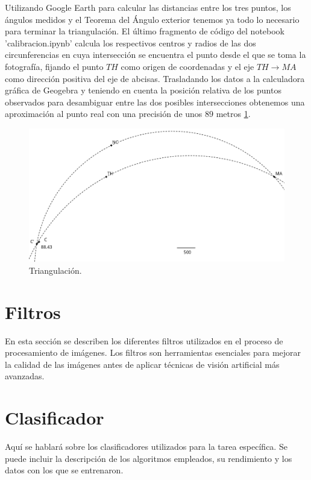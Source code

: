 \documentclass[12pt]{article}
\begin{document}
Utilizando Google Earth para calcular las distancias entre los tres puntos, los ángulos medidos y el Teorema del Ángulo exterior tenemos ya todo lo necesario para terminar la triangulación.
El último fragmento de código del notebook 'calibracion.ipynb' calcula los respectivos centros y radios de las dos circunferencias en cuya intersección se encuentra el punto desde el que se toma la fotografía, fijando el punto $TH$ como origen de coordenadas y el eje $TH \rightarrow MA$ como dirección positiva del eje de abcisas.
Trasladando los datos a la calculadora gráfica de Geogebra y teniendo en cuenta la posición relativa de los puntos observados para desambiguar entre las dos posibles intersecciones obtenemos una aproximación al punto real con una precisión de unos $89$ metros \ref{fig:geogebra_triangulacion}.
\begin{figure}[H]
    \centering
    \includegraphics[width=1\textwidth]{images_calibracion/Triangulacion_Geogebra.png} 
    \caption{Triangulación.}
    \label{fig:geogebra_triangulacion}
\end{figure}
\newpage

\section{Filtros}
En esta sección se describen los diferentes filtros utilizados en el proceso de procesamiento de imágenes. Los filtros son herramientas esenciales para mejorar la calidad de las imágenes antes de aplicar técnicas de visión artificial más avanzadas.



\newpage

\section{Clasificador}
Aquí se hablará sobre los clasificadores utilizados para la tarea específica. Se puede incluir la descripción de los algoritmos empleados, su rendimiento y los datos con los que se entrenaron.
\end{document}
